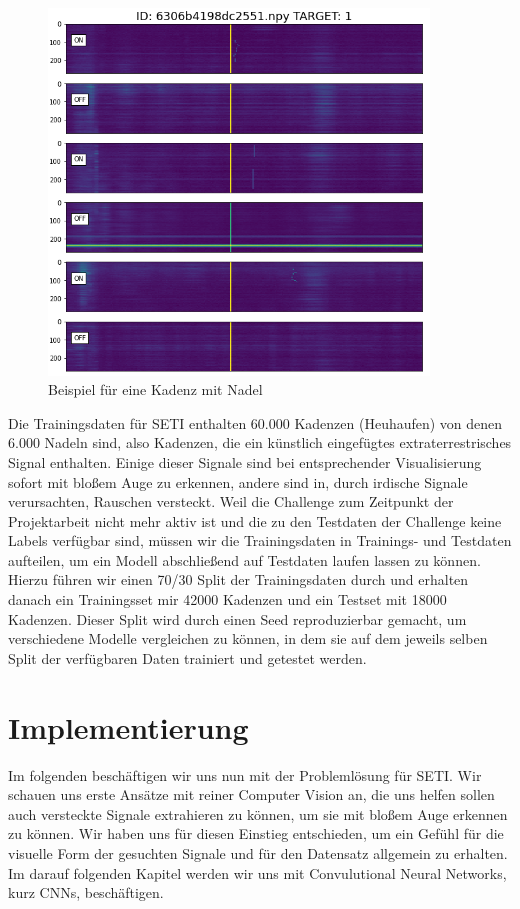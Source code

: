 \documentclass[12pt, a4paper]{article}
\begin{document}
\begin{figure}[t]
\centering
\includegraphics[width=0.9\textwidth]{"img/kadenz_pos_1.png"}
\caption{Beispiel für eine Kadenz mit Nadel}
\label{fig:kadenz_pos_1}
\end{figure}

Die Trainingsdaten für SETI enthalten 60.000 Kadenzen (Heuhaufen) von denen 6.000 Nadeln sind, also Kadenzen, die ein künstlich eingefügtes extraterrestrisches Signal enthalten. Einige dieser Signale sind bei entsprechender Visualisierung sofort mit bloßem Auge zu erkennen, andere sind in, durch irdische Signale verursachten, Rauschen versteckt. Weil die Challenge zum Zeitpunkt der Projektarbeit nicht mehr aktiv ist und die zu den Testdaten der Challenge keine Labels verfügbar sind, müssen wir die Trainingsdaten in Trainings- und Testdaten aufteilen, um ein Modell abschließend auf Testdaten laufen lassen zu können. Hierzu führen wir einen 70/30 Split der Trainingsdaten durch und erhalten danach ein Trainingsset mir 42000 Kadenzen und ein Testset mit 18000 Kadenzen. Dieser Split wird durch einen Seed reproduzierbar gemacht, um verschiedene Modelle vergleichen zu können, in dem sie auf dem jeweils selben Split der verfügbaren Daten trainiert und getestet werden.


\section{Implementierung}
Im folgenden beschäftigen wir uns nun mit der Problemlösung für SETI. Wir schauen uns erste Ansätze mit reiner Computer Vision an, die uns helfen sollen auch versteckte Signale extrahieren zu können, um sie mit bloßem Auge erkennen zu können. Wir haben uns für diesen Einstieg entschieden, um ein Gefühl für die visuelle Form der gesuchten Signale und für den Datensatz allgemein zu erhalten. Im darauf folgenden Kapitel werden wir uns mit Convulutional Neural Networks, kurz CNNs, beschäftigen.
\end{document}
